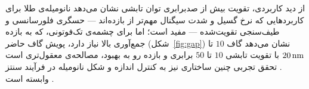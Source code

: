 از دید کاربردی، تقویت بیش از صدبرابری توان تابشی نشان می‌دهد نانومیله‌ی
طلا برای کاربردهایی که نرخ گسیل و شدت سیگنال مهم‌تر از بازده‌اند —
حسگری فلورسانسی و طیف‌سنجی تقویت‌شده — مفید است؛ اما برای چشمه‌ی
تک‌فوتونی، که به بازده جمع‌آوری بالا نیاز دارد، پویش گاف حاضر
(شکل~\ref{fig:gap}) نشان می‌دهد گاف $10$ تا $20\,\text{nm}$ با تقویت تابشی
$10$ تا $50$ برابری و بازده رو به بهبود، مصالحه‌ی معقول‌تری است
\cite{mohammadi2008gold, koenderink2017single}. تحقق تجربی چنین
ساختاری نیز به کنترل اندازه و شکل نانومیله در فرآیند سنتز وابسته است
\cite{nikoobakht2003preparation}.
